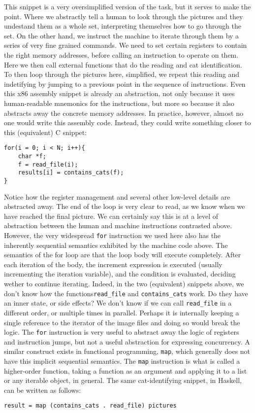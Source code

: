 This snippet is a very oversimplified version of the task, but it serves to make the point.
Where we abstractly tell a human to look through the pictures and they undestand them as a whole set, interpreting themselves how to go through the set.
On the other hand, we instruct the machine to iterate through them by a series of very fine grained commands.
We need to set certain registers to contain the right memory addresses, before calling an instruction to operate on them.
Here we then call external functions that do the reading and cat identification.
To then loop through the pictures here, simplified, we repeat this reading and indetifying by jumping to a previous point in the sequence of instructions.
Even this x86 assembly snippet is already an abstraction, not only because it uses human-readable mnemonics for the instructions, but more so because it also abstracts away the concrete memory addresses.
In practice, however, almost no one would write this assembly code. Instead, they could write something closer to this (equivalent) C snippet:
\begin{verbatim}
for(i = 0; i < N; i++){
    char *f;
    f = read_file(i);
    results[i] = contains_cats(f); 
}
\end{verbatim}

Notice how the register management and several other low-level details are abstracted away.
The end of the loop is very clear to read, as we know when we have reached the final picture.
We can certainly say this is at a level of abstraction between the human and machine instructions contrasted above.
However, the very widespread \texttt{for} instruction we used here also has the inherently sequential semantics exhibited by the machine code above.
The semantics of the for loop are that the loop body will execute completely.
After each iteration of the body, the increment expression is executed (usually incrementing the iteration variable), and the condition is evaluated, deciding wether to continue iterating.
Indeed, in the two (equivalent) snippets above, we don't know how the functions\texttt{read\_file} and \texttt{contains\_cats} work.
Do they have an inner state, or side effects?
We don't know if we can call \texttt{read\_file} in a different order, or multiple times in parallel.
Perhaps it is internally keeping a single reference to the iterator of the image files and doing so would break the logic.
The \texttt{for} instruction is very useful to abstract away the logic of registers and instruction jumps, but not a useful abstraction for expressing concurrency.
A similar construct exists in functional programming, \texttt{map}, which generally does not have this implicit sequential semantics.
The \texttt{map} instruction is what is called a higher-order function, taking a function as an argument and applying it to a list or any iterable object, in general.
The same cat-identifying snippet, in Haskell, can be written as follows:
\begin{verbatim}
result = map (contains_cats . read_file) pictures
\end{verbatim}

